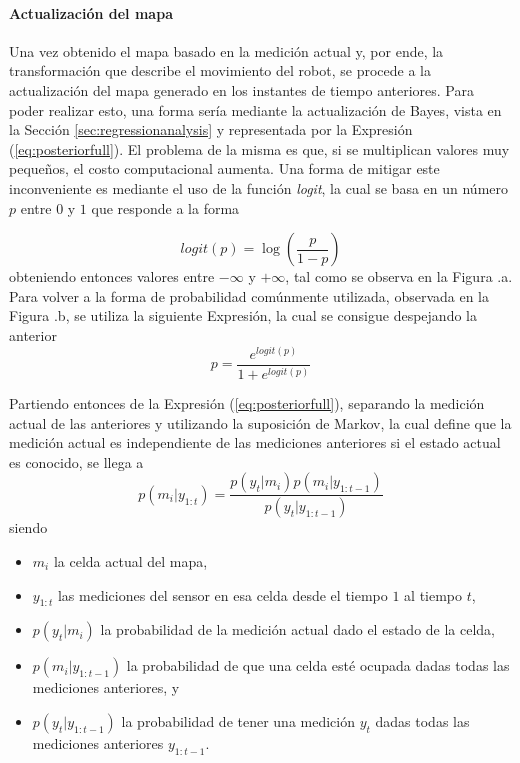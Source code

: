 \paragraph{Actualización del mapa}
Una vez obtenido el mapa basado en la medición actual y, por ende, la transformación que describe el movimiento del robot, se procede a la actualización del mapa generado en los instantes de tiempo anteriores. Para poder realizar esto, una forma sería mediante la actualización de Bayes, vista en la Sección \ref{sec:regressionanalysis} y representada por la Expresión (\ref{eq:posteriorfull}). El problema de la misma es que, si se multiplican valores muy pequeños, el costo computacional aumenta. Una forma de mitigar este inconveniente es mediante el uso de la función \textit{logit}, la cual se basa en un número $p$ entre $0$ y $1$ que responde a la forma

\begin{equation}
    logit(p) = \log\left(\frac{p}{1-p}\right)
\end{equation}
obteniendo entonces valores entre $-\infty$ y $+\infty$, tal como se observa en la Figura .a. Para volver a la forma de probabilidad comúnmente utilizada, observada en la Figura .b, se utiliza la siguiente Expresión, la cual se consigue despejando la anterior
\begin{equation}
    p = \frac{e^{logit(p)}}{1+e^{logit(p)}}
\end{equation}

Partiendo entonces de la Expresión (\ref{eq:posteriorfull}), separando la medición actual de las anteriores y utilizando la suposición de Markov, la cual define que la medición actual es independiente de las mediciones anteriores si el estado actual es conocido, se llega a
\begin{equation}
    p(m_i|y_{1:t}) = \frac{p(y_t|m_i)p(m_i|y_{1:t-1})}{p(y_t|y_{1:t-1})}
\end{equation}
siendo 
\begin{itemize}
    \item $m_i$ la celda actual del mapa,
    \item $y_{1:t}$ las mediciones del sensor en esa celda desde el tiempo $1$ al tiempo $t$, 
    \item $p(y_t|m_i)$ la probabilidad de la medición actual dado el estado de la celda,
    \item $p(m_i|y_{1:t-1})$ la probabilidad de que una celda esté ocupada dadas todas las mediciones anteriores, y
    \item $p(y_t|y_{1:t-1})$ la probabilidad de tener una medición $y_t$ dadas todas las mediciones anteriores $y_{1:t-1}$.
\end{itemize}


